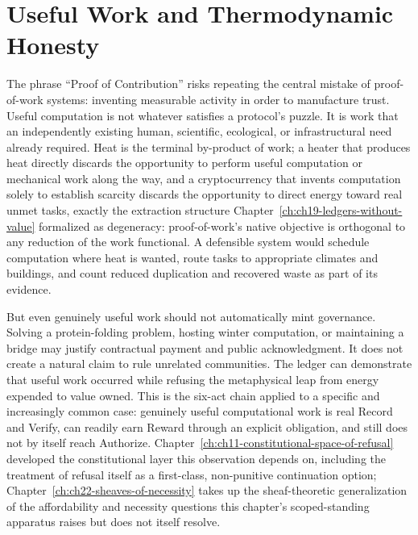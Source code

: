 \section{Useful Work and Thermodynamic Honesty}

The phrase ``Proof of Contribution'' risks repeating the central mistake of proof-of-work systems: inventing measurable activity in order to manufacture trust. Useful computation is not whatever satisfies a protocol's puzzle. It is work that an independently existing human, scientific, ecological, or infrastructural need already required. Heat is the terminal by-product of work; a heater that produces heat directly discards the opportunity to perform useful computation or mechanical work along the way, and a cryptocurrency that invents computation solely to establish scarcity discards the opportunity to direct energy toward real unmet tasks, exactly the extraction structure Chapter~\ref{ch:ch19-ledgers-without-value} formalized as degeneracy: proof-of-work's native objective is orthogonal to any reduction of the work functional. A defensible system would schedule computation where heat is wanted, route tasks to appropriate climates and buildings, and count reduced duplication and recovered waste as part of its evidence.

But even genuinely useful work should not automatically mint governance. Solving a protein-folding problem, hosting winter computation, or maintaining a bridge may justify contractual payment and public acknowledgment. It does not create a natural claim to rule unrelated communities. The ledger can demonstrate that useful work occurred while refusing the metaphysical leap from energy expended to value owned. This is the six-act chain applied to a specific and increasingly common case: genuinely useful computational work is real Record and Verify, can readily earn Reward through an explicit obligation, and still does not by itself reach Authorize. Chapter~\ref{ch:ch11-constitutional-space-of-refusal} developed the constitutional layer this observation depends on, including the treatment of refusal itself as a first-class, non-punitive continuation option; Chapter~\ref{ch:ch22-sheaves-of-necessity} takes up the sheaf-theoretic generalization of the affordability and necessity questions this chapter's scoped-standing apparatus raises but does not itself resolve.
